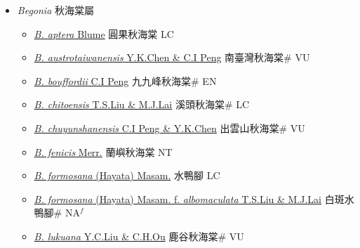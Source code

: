 
  \begin{itemize}
 \item[] \textit{Begonia} 秋海棠屬
                    
  \begin{itemize}
        \item[] \href{http://www.theplantlist.org/tpl1.1/search?q=Begonia+aptera}{\textit{B. aptera} Blume}   圓果秋海棠 LC
        \item[] \href{http://www.theplantlist.org/tpl1.1/search?q=Begonia+austrotaiwanensis}{\textit{B. austrotaiwanensis} Y.K.Chen \& C.I Peng}   南臺灣秋海棠\# VU
        \item[] \href{http://www.theplantlist.org/tpl1.1/search?q=Begonia+bouffordii}{\textit{B. bouffordii} C.I Peng}   九九峰秋海棠\# EN
        \item[] \href{http://www.theplantlist.org/tpl1.1/search?q=Begonia+chitoensis}{\textit{B. chitoensis} T.S.Liu \& M.J.Lai}   溪頭秋海棠\# LC
        \item[] \href{http://www.theplantlist.org/tpl1.1/search?q=Begonia+chuyunshanensis}{\textit{B. chuyunshanensis} C.I Peng \& Y.K.Chen}   出雲山秋海棠\# VU
        \item[] \href{http://www.theplantlist.org/tpl1.1/search?q=Begonia+fenicis}{\textit{B. fenicis} Merr.}   蘭嶼秋海棠 NT
        \item[] \href{http://www.theplantlist.org/tpl1.1/search?q=Begonia+formosana}{\textit{B. formosana} (Hayata) Masam.}   水鴨腳 LC
        \item[] \href{http://www.theplantlist.org/tpl1.1/search?q=Begonia+formosana+ f. +albomaculata}{\textit{B. formosana} (Hayata) Masam.  f.  \textit{albomaculata} T.S.Liu \& M.J.Lai}   白斑水鴨腳\# NA$^f$
        \item[] \href{http://www.theplantlist.org/tpl1.1/search?q=Begonia+lukuana}{\textit{B. lukuana} Y.C.Liu \& C.H.Ou}   鹿谷秋海棠\# VU

\end{itemize}
\end{itemize}
